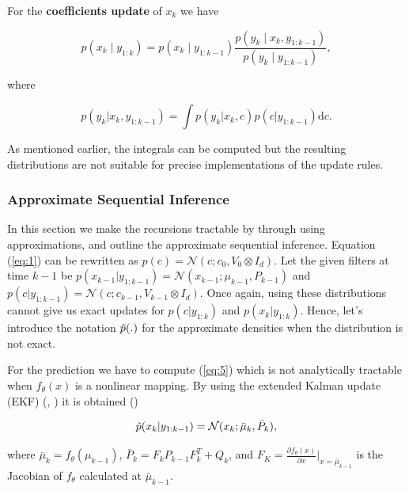 \documentclass{mldsmsc}
\begin{document}
\noindent For the \textbf{coefficients update} of $x_k$ we have

\begin{equation}
    p(x_k \mid y_{1:k}) = p(x_k \mid y_{1:k-1})  \frac{p(y_k \mid x_k, y_{1:k-1})}{p(y_k \mid y_{1:k-1})},
\end{equation}

\noindent where

\begin{equation}
    p(y_k | x_k, y_{1:k-1}) = \int p(y_k | x_k, c) p(c | y_{1:k-1})\text{d}c.
\end{equation}

\noindent As mentioned earlier, the integrals can be computed but the resulting distributions are not suitable for precise implementations of the update rules.

\subsubsection{Approximate Sequential Inference}

In this section we make the recursions tractable by through using approximations, and outline the approximate sequential inference. Equation (\ref{eq:1}) can be rewritten as $p(c) = \mathcal{N}(c; c_0, V_0 \otimes I_d)$. Let the given filters at time $k-1$ be $p(x_{k-1} | y_{1:k-1}) = \mathcal{N}(x_{k-1};\mu_{k-1}, P_{k-1})$ and $p(c | y_{1:k-1}) = \mathcal{N}(c; c_{k-1}, V_{k-1} \otimes I_d)$. Once again, using these distributions cannot give us exact updates for $p(c | y_{1:k})$ and $p(x_k | y_{1:k})$. Hence, let's introduce the notation $\Tilde{p}(.)$ for the approximate densities when the distribution is not exact. \newline

\noindent For the prediction we have to compute (\ref{eq:5}) which is not analytically tractable when $f_{\theta}(x)$ is a nonlinear mapping. By using the extended Kalman update (EKF) (\cite{mclean1962optimal}, \cite{anderson1979optimal}) it is obtained (\cite{akyildiz2021probabilistic})

\begin{equation}
    \Tilde{p}(x_k | y_{1:k-1}) = \mathcal{N}(x_k; \bar{\mu}_k, \bar{P}_k), 
\end{equation}

\noindent where $\bar{\mu}_k = f_{\theta}(\mu_{k-1})$, $\bar{P}_k = F_k P_{k-1} F^{T}_{k} + Q_k$, and $F_K = \frac{\partial f_{\theta}(x)}{\partial x} \vert_{x = \bar{\mu}_{k-1}}$ is the Jacobian of $f_{\theta}$ calculated at $\bar{\mu}_{k-1}$. \newline
\end{document}
